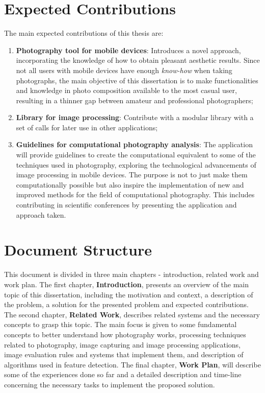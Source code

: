 \section{Expected Contributions}

The main expected contributions of this thesis are:
\begin{enumerate}
	\item \textbf{Photography tool for mobile devices}: Introduces a novel approach, incorporating the knowledge of how to obtain pleasant aesthetic results. Since not all users with mobile devices have enough \emph{know-how} when taking photographs, the main objective of this dissertation is to make functionalities and knowledge in photo composition available to the most casual user, resulting in a thinner gap between amateur and professional photographers;

	\item \textbf{Library for image processing}: Contribute with a modular library with a set of calls for later use in other applications;
	
	\item \textbf{Guidelines for computational photography analysis}: The application will provide guidelines to create the computational equivalent to some of the techniques used in photography, exploring the technological advancements of image processing in mobile devices. The purpose is not to just make them computationally possible but also inspire the implementation of new and improved methods for the field of computational photography. This includes contributing in scientific conferences by presenting the application and approach taken.
	
\end{enumerate}

\section{Document Structure}

This document is divided in three main chapters - introduction, related work and work plan. The first chapter, \textbf{Introduction}, presents an overview of the main topic of this dissertation, including the motivation and context, a description of the problem, a solution for the presented problem and expected contributions.
The second chapter, \textbf{Related Work}, describes related systems and the necessary concepts to grasp this topic. The main focus is given to some fundamental concepts to better understand how photography works, processing techniques related to photography, image capturing and image processing applications, image evaluation rules and systems that implement them, and description of algorithms used in feature detection. The final chapter, \textbf{Work Plan}, will describe some of the experiences done so far and a detailed description and time-line concerning the necessary tasks to implement the proposed solution.